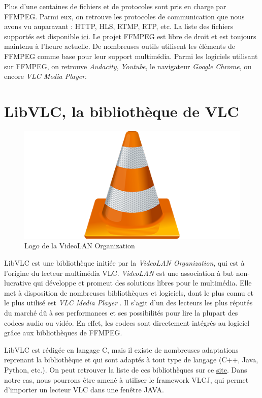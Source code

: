 \documentclass{polytech/polytech}
\begin{document}
Plus d’une centaines de fichiers et de protocoles sont pris en charge par FFMPEG. Parmi eux, on retrouve les protocoles de communication que nous avons vu auparavant : HTTP, HLS, RTMP, RTP, etc. La liste des fichiers supportés est disponible \href{http://ffmpeg.org/general.html#Supported-File-Formats_002c-Codecs-or-Features}{ici}. Le projet FFMPEG est libre de droit et est toujours maintenu à l'heure actuelle. De nombreuses outils utilisent les éléments de FFMPEG comme base pour leur support multimédia. Parmi les logiciels utilisant sur FFMPEG, on retrouve \textit{Audacity}, \textit{Youtube}, le navigateur \textit{Google Chrome}, ou encore \textit{VLC Media Player}.


\section{LibVLC, la bibliothèque de VLC}

\begin{figure}
	\includegraphics[scale=0.35]{images/vlc-media-player-logo}
	\caption{Logo de la VideoLAN Organization}
	\label{fig:logovlc}
\end{figure}

LibVLC est une bibliothèque initiée par la \textit{VideoLAN Organization}, qui est à l’origine du lecteur multimédia VLC. \textit{VideoLAN} est une association à but non-lucrative qui développe et promeut des solutions libres pour le multimédia. Elle met à disposition de nombreuses bibliothèques et logiciels, dont le plus connu et le plus utilisé est \textit{VLC Media Player} \cite{_vlc:_2017}. Il s’agit d’un des lecteurs les plus réputés du marché dû à ses performances et ses possibilités pour lire la plupart des codecs audio ou vidéo. En effet, les codecs sont directement intégrés au logiciel grâce aux bibliothèques de FFMPEG.

LibVLC est rédigée en langage C, mais il existe de nombreuses adaptations reprenant la bibliothèque et qui sont adaptés à tout type de langage (C++, Java, Python, etc.). On peut retrouver la liste de ces bibliothèques sur ce \href{https://wiki.videolan.org/LibVLC/}{site}. Dans notre cas, nous pourrons être amené à utiliser le framework VLCJ, qui permet d’importer un lecteur VLC dans une fenêtre JAVA.
\end{document}
